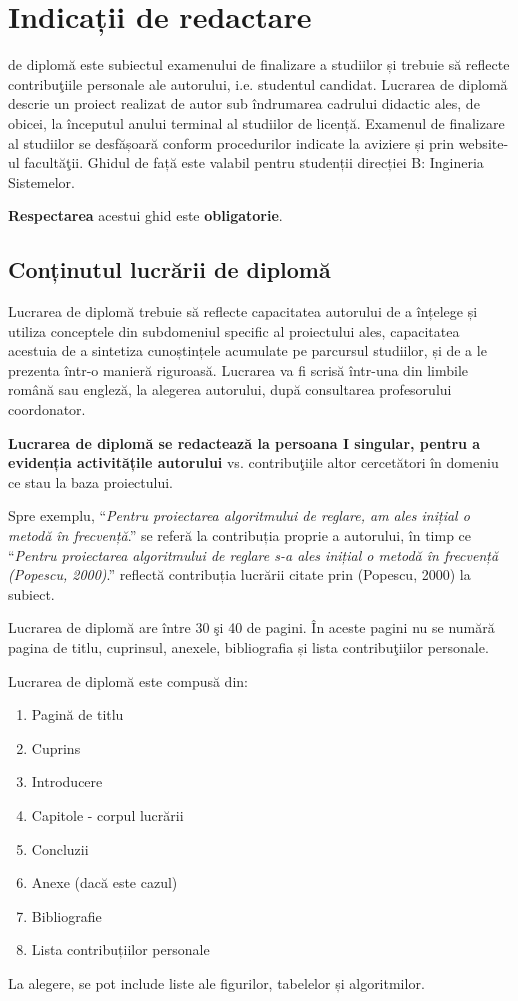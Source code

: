 \chapter{Indicații de redactare}
\label{chap:intro}

 de diplomă este subiectul examenului de finalizare a studiilor și trebuie să reflecte contribuţiile personale ale autorului, i.e. studentul candidat. Lucrarea de diplomă descrie un proiect realizat de autor sub îndrumarea cadrului didactic ales, de obicei, la începutul anului terminal al studiilor de licență. Examenul de finalizare al studiilor se desfășoară conform procedurilor indicate la aviziere și prin website-ul facultăţii. Ghidul de față este valabil pentru studenții direcției B: Ingineria Sistemelor.

\textbf{Respectarea} acestui ghid este \textbf{obligatorie}.

\section{Conținutul lucrării de diplomă}

Lucrarea de diplomă trebuie să reflecte capacitatea autorului de a înțelege și utiliza conceptele din subdomeniul specific al proiectului ales, capacitatea acestuia de a sintetiza cunoștințele acumulate pe parcursul studiilor, și de a le prezenta într-o manieră riguroasă. Lucrarea va fi scrisă într-una din limbile română sau engleză, la alegerea autorului, după consultarea profesorului coordonator.

\textbf{Lucrarea de diplomă se redactează la persoana I singular, pentru a evidenția activitățile autorului} vs. contribuţiile altor cercetători în domeniu ce stau la baza proiectului.

Spre exemplu, ``\emph{Pentru proiectarea algoritmului de reglare, am ales inițial o metodă în frecvență}.'' se referă la contribuția proprie a autorului, în timp ce ``\emph{Pentru proiectarea algoritmului de reglare s-a ales inițial o metodă în frecvență (Popescu, 2000)}.'' reflectă contribuția lucrării citate prin (Popescu, 2000) la subiect.


Lucrarea de diplomă are între 30 şi 40 de pagini. În aceste pagini nu se numără pagina de titlu, cuprinsul, anexele, bibliografia și lista contribuţiilor personale.

Lucrarea de diplomă este compusă din:

\begin{enumerate}[label=\alph*.]
	\item Pagină de titlu
	\item Cuprins
	\item Introducere
	\item Capitole - corpul lucrării
	\item Concluzii
	\item Anexe (dacă este cazul)
	\item Bibliografie  
	\item Lista contribuțiilor personale
\end{enumerate}
La alegere, se pot include liste ale figurilor, tabelelor și algoritmilor.

